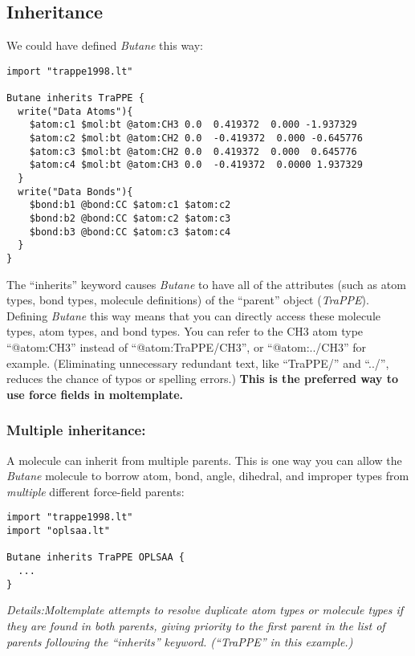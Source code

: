 \documentclass[11pt]{article}
\begin{document}
\subsection{Inheritance}
\label{sec:inheritance}
We could have defined \textit{Butane} this way:
\begin{verbatim}
import "trappe1998.lt"

Butane inherits TraPPE {
  write("Data Atoms"){
    $atom:c1 $mol:bt @atom:CH3 0.0  0.419372  0.000 -1.937329
    $atom:c2 $mol:bt @atom:CH2 0.0  -0.419372  0.000 -0.645776
    $atom:c3 $mol:bt @atom:CH2 0.0  0.419372  0.000  0.645776
    $atom:c4 $mol:bt @atom:CH3 0.0  -0.419372  0.0000 1.937329
  }
  write("Data Bonds"){
    $bond:b1 @bond:CC $atom:c1 $atom:c2
    $bond:b2 @bond:CC $atom:c2 $atom:c3
    $bond:b3 @bond:CC $atom:c3 $atom:c4
  }
}
\end{verbatim}
The ``inherits'' keyword causes \textit{Butane} to have all of the attributes
(such as atom types, bond types, molecule definitions) of the ``parent'' object
(\textit{TraPPE}).
Defining \textit{Butane} this way means that you can directly access
these molecule types, atom types, and bond types.
You can refer to the CH3 atom type ``@atom:CH3'' instead of
``@atom:TraPPE/CH3'', or ``@atom:../CH3'' for example.
(Eliminating unnecessary redundant text, like ``TraPPE/'' and ``../'',
reduces the chance of typos or spelling errors.)
\textbf{This is the preferred way to use force fields in moltemplate.}


\subsubsection{Multiple inheritance:}
\label{sec:multiple_inheritance}
A molecule can inherit from multiple parents.
This is one way you can allow the \textit{Butane} molecule
to borrow atom, bond, angle, dihedral, and improper types from
\textit{multiple} different force-field parents:
\begin{verbatim}
import "trappe1998.lt"
import "oplsaa.lt"

Butane inherits TraPPE OPLSAA {
  ...
}
\end{verbatim}
\textit{Details:Moltemplate attempts to resolve duplicate atom types or 
molecule types if they are found in both parents, giving priority to the 
first parent in the list of parents following the ``inherits'' keyword. 
(``TraPPE'' in this example.)
}
\end{document}
